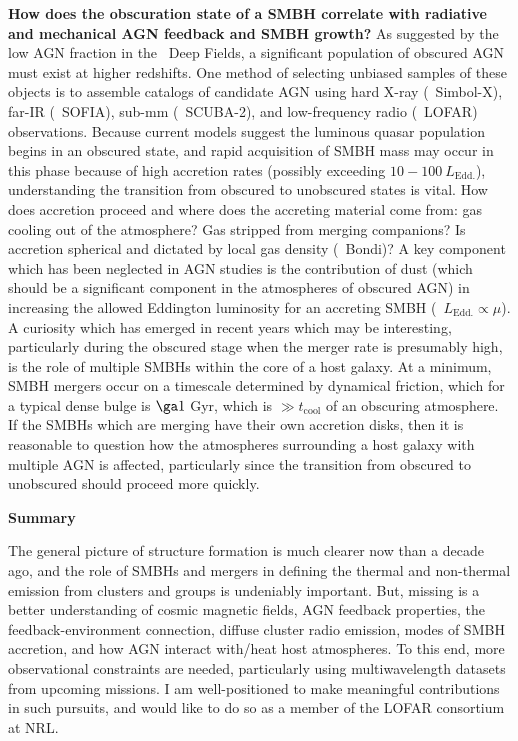 \documentclass[12pt]{article}
\begin{document}
{\bf{How does the obscuration state of a SMBH correlate with radiative
    and mechanical AGN feedback and SMBH growth?}} As suggested by the
low AGN fraction in the \chandra\ Deep Fields, a significant
population of obscured AGN must exist at higher redshifts. One method
of selecting unbiased samples of these objects is to assemble catalogs
of candidate AGN using hard X-ray (\ie\ Simbol-X), far-IR
(\ie\ SOFIA), sub-mm (\ie\ SCUBA-2), and low-frequency radio
(\ie\ LOFAR) observations. Because current models suggest the luminous
quasar population begins in an obscured state, and rapid acquisition
of SMBH mass may occur in this phase because of high accretion rates
(possibly exceeding $10-100~L_{\mathrm{Edd.}}$), understanding the
transition from obscured to unobscured states is vital. How does
accretion proceed and where does the accreting material come from: gas
cooling out of the atmosphere? Gas stripped from merging companions?
Is accretion spherical and dictated by local gas density (\eg\ Bondi)?
A key component which has been neglected in AGN studies is the
contribution of dust (which should be a significant component in the
atmospheres of obscured AGN) in increasing the allowed Eddington
luminosity for an accreting SMBH (\ie\ $L_{\mathrm{Edd.}} \propto
\mu$). A curiosity which has emerged in recent years which may be
interesting, particularly during the obscured stage when the merger
rate is presumably high, is the role of multiple SMBHs within the core
of a host galaxy. At a minimum, SMBH mergers occur on a timescale
determined by dynamical friction, which for a typical dense bulge is
$\ga 1$ Gyr, which is $\gg t_{\mathrm{cool}}$ of an obscuring
atmosphere. If the SMBHs which are merging have their own accretion
disks, then it is reasonable to question how the atmospheres
surrounding a host galaxy with multiple AGN is affected, particularly
since the transition from obscured to unobscured should proceed more
quickly.

{\bf{Summary}}

The general picture of structure formation is much clearer now than a
decade ago, and the role of SMBHs and mergers in defining the thermal
and non-thermal emission from clusters and groups is undeniably
important. But, missing is a better understanding of cosmic magnetic
fields, AGN feedback properties, the feedback-environment connection,
diffuse cluster radio emission, modes of SMBH accretion, and how AGN
interact with/heat host atmospheres. To this end, more observational
constraints are needed, particularly using multiwavelength datasets
from upcoming missions. I am well-positioned to make meaningful
contributions in such pursuits, and would like to do so as a member of
the LOFAR consortium at NRL.

\scriptsize


 
\end{document}
